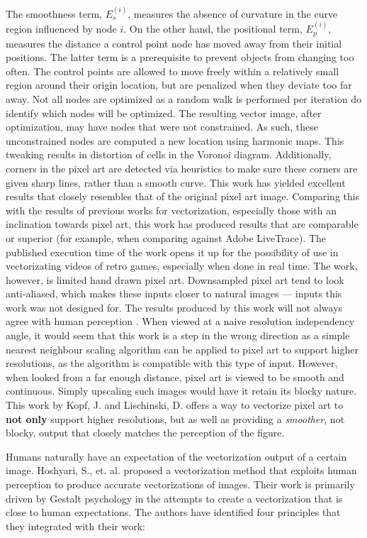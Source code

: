 The smoothness term, $E_{s}^{(i)}$, measures the absence of curvature in the curve region influenced by node $i$. On the other hand, the positional term, $E_{p}^{(i)}$, measures the distance a control point node has moved away from their initial positions. The latter term is a prerequisite to prevent objects from changing too often. The control points are allowed to move freely within a relatively small region around their origin location, but are penalized when they deviate too far away. Not all nodes are optimized as a random walk is performed per iteration do identify which nodes will be optimized. The resulting vector image, after optimization, may have nodes that were not constrained. As such, these unconstrained nodes are computed a new location using harmonic maps. This tweaking results in distortion of cells in the Voronoi diagram. Additionally, corners in the pixel art are detected via heuristics to make sure these corners are given sharp lines, rather than a smooth curve. This work has yielded excellent results that closely resembles that of the original pixel art image. Comparing this with the results of previous works for vectorization, especially those with an inclination towards pixel art, this work has produced results that are comparable or superior (for example, when comparing against Adobe LiveTrace). The published execution time of the work opens it up for the possibility of use in vectorizating videos of retro games, especially when done in real time. The work, however, is limited hand drawn pixel art. Downsampled pixel art tend to look anti-aliased, which makes these inputs closer to natural images --- inputs this work was not designed for. The results produced by this work will not always agree with human perception \cite{depixelizingpixelart}. When viewed at a naive resolution independency angle, it would seem that this work is a step in the wrong direction as a simple nearest neighbour scaling algorithm can be applied to pixel art to support higher resolutions, as the algorithm is compatible with this type of input. However, when looked from a far enough distance, pixel art is viewed to be smooth and continuous. Simply upscaling such images would have it retain its blocky nature. This work by Kopf, J. and Lischinski, D. offers a way to vectorize pixel art to \textbf{not only} support higher resolutions, but as well as providing a \textit{smoother}, not blocky, output that closely matches the perception of the figure.

Humans naturally have an expectation of the vectorization output of a certain image. Hoshyari, S., et. al. proposed a vectorization method that exploits human perception to produce accurate vectorizations of images. Their work is primarily driven by Gestalt psychology in the attempts to create a vectorization that is close to human expectations. The authors have identified four principles that they integrated with their work:

